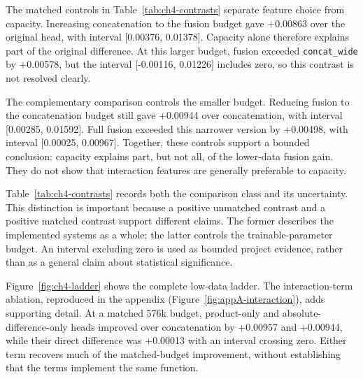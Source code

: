 The matched controls in Table~\ref{tab:ch4-contrasts} separate feature choice
from capacity. Increasing concatenation to the fusion budget gave +0.00863 over
the original head, with interval [0.00376, 0.01378]. Capacity alone therefore
explains part of the original difference. At this larger budget, fusion
exceeded \texttt{concat\_wide} by +0.00578, but the interval [-0.00116,
0.01226] includes zero, so this contrast is not resolved clearly.

The complementary comparison controls the smaller budget. Reducing fusion to
the concatenation budget still gave +0.00944 over concatenation, with interval
[0.00285, 0.01592]. Full fusion exceeded this narrower version by +0.00498,
with interval [0.00025, 0.00967]. Together, these controls support a bounded
conclusion: capacity explains part, but not all, of the lower-data fusion gain.
They do not show that interaction features are generally preferable to
capacity.

Table~\ref{tab:ch4-contrasts} records both the comparison class and its
uncertainty. This distinction is important because a positive unmatched
contrast and a positive matched contrast support different claims. The former
describes the implemented systems as a whole; the latter controls the
trainable-parameter budget. An interval excluding zero is used as bounded
project evidence, rather than as a general claim about statistical
significance.

Figure~\ref{fig:ch4-ladder} shows the complete low-data ladder. The
interaction-term ablation, reproduced in the appendix (Figure~\ref{fig:appA-interaction}), adds supporting detail.
At a matched 576k budget,
product-only and absolute-difference-only heads improved over concatenation by
+0.00957 and +0.00944, while their direct difference was +0.00013 with an
interval crossing zero. Either term recovers much of the matched-budget
improvement, without establishing that the terms implement the same function.

\begin{table}[p]
\centering
\caption[Interaction and capacity contrasts.]{Paired contrasts on the 7,714-row top-100 development view. CAPACITY\_CONFOUNDED comparisons change features and capacity; CLEAN\_PAIRED\_CONTROL comparisons hold the trainable-parameter budget. ``Excludes zero'' is the project evidence criterion, not a significance test.}
\label{tab:ch4-contrasts}
\begingroup\scriptsize\setlength{\tabcolsep}{1pt}
\renewenvironment{longtable}[1]{\begin{tabular}{|p{0.20\textwidth}|p{0.17\textwidth}|p{0.075\textwidth}|p{0.20\textwidth}|p{0.095\textwidth}|p{0.075\textwidth}|}}{\end{tabular}}
\let\endhead\relax\renewcommand{\_}{\textunderscore\allowbreak}

\endgroup
\end{table}

